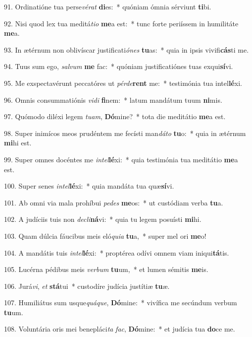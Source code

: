 91. Ordinatióne tua perse\textit{vé}\textit{rat} \textbf{di}es:~*  quóniam ómnia sérviunt \textbf{ti}bi.\

92. Nisi quod lex tua meditá\textit{ti}\textit{o} \textbf{me}a est:~*  tunc forte periíssem in humilitáte \textbf{me}a.\

93. In ætérnum non oblivíscar justificati\textit{ó}\textit{nes} \textbf{tu}as:~*  quia in ipsis vivifi\textbf{cás}ti me.\

94. Tuus sum ego, \textit{sal}\textit{vum} \textbf{me} fac:~*  quóniam justificatiónes tuas exqui\textbf{sí}vi.\

95. Me exspectavérunt peccatóres ut \textit{pér}\textit{de}\textbf{rent} me:~*  testimónia tua intel\textbf{lé}xi.\

96. Omnis consummatiónis \textit{vi}\textit{di} \textbf{fi}nem:~*  latum mandátum tuum \textbf{ni}mis.\

97. Quómodo diléxi legem \textit{tu}\textit{am}, \textbf{Dó}mine?~*  tota die meditátio \textbf{me}a est.\

98. Super inimícos meos prudéntem me fecísti man\textit{dá}\textit{to} \textbf{tu}o:~*  quia in ætérnum \textbf{mi}hi est.\

99. Super omnes docéntes me \textit{in}\textit{tel}\textbf{lé}xi:~*  quia testimónia tua meditátio \textbf{me}a est.\

100. Super senes \textit{in}\textit{tel}\textbf{lé}xi:~*  quia mandáta tua quæ\textbf{sí}vi.\

101. Ab omni via mala prohíbui \textit{pe}\textit{des} \textbf{me}os:~*  ut custódiam verba \textbf{tu}a.\

102. A judíciis tuis non \textit{de}\textit{cli}\textbf{ná}vi:~*  quia tu legem posuísti \textbf{mi}hi.\

103. Quam dúlcia fáucibus meis eló\textit{qui}\textit{a} \textbf{tu}a,~*  super mel ori \textbf{me}o!\

104. A mandátis tuis \textit{in}\textit{tel}\textbf{lé}xi:~*  proptérea odívi omnem viam iniqui\textbf{tá}tis.\

105. Lucérna pédibus meis \textit{ver}\textit{bum} \textbf{tu}um,~*  et lumen sémitis \textbf{me}is.\

106. Jurá\textit{vi}, \textit{et} \textbf{stá}tui~*  custodíre judícia justítiæ \textbf{tu}æ.\

107. Humiliátus sum usque\textit{quá}\textit{que}, \textbf{Dó}mine:~*  vivífica me secúndum verbum \textbf{tu}um.\

108. Voluntária oris mei benepláci\textit{ta} \textit{fac}, \textbf{Dó}mine:~*  et judícia tua \textbf{do}ce me.\

